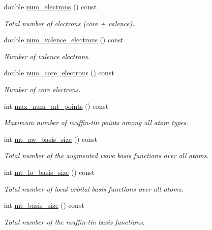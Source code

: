 \begin{DoxyCompactItemize}
\item 
double \hyperlink{classsirius_1_1_unit__cell_af773aee1295a5be6c706b29959ff4592}{num\+\_\+electrons} () const 
\begin{DoxyCompactList}\small\item\em Total number of electrons (core + valence). \end{DoxyCompactList}\item 
double \hyperlink{classsirius_1_1_unit__cell_a3d0dc243ec23f8fed279c78f67da015a}{num\+\_\+valence\+\_\+electrons} () const 
\begin{DoxyCompactList}\small\item\em Number of valence electrons. \end{DoxyCompactList}\item 
double \hyperlink{classsirius_1_1_unit__cell_ae418b2e1ec7145fecc823dea73589b1a}{num\+\_\+core\+\_\+electrons} () const 
\begin{DoxyCompactList}\small\item\em Number of core electrons. \end{DoxyCompactList}\item 
int \hyperlink{classsirius_1_1_unit__cell_a6a1a396053eb4992139576d887c66662}{max\+\_\+num\+\_\+mt\+\_\+points} () const 
\begin{DoxyCompactList}\small\item\em Maximum number of muffin-\/tin points among all atom types. \end{DoxyCompactList}\item 
int \hyperlink{classsirius_1_1_unit__cell_a163d3e6e7306ffaf6f51eb20e8d8228d}{mt\+\_\+aw\+\_\+basis\+\_\+size} () const 
\begin{DoxyCompactList}\small\item\em Total number of the augmented wave basis functions over all atoms. \end{DoxyCompactList}\item 
int \hyperlink{classsirius_1_1_unit__cell_a5ebddaa856d8f93893d7c041251afb35}{mt\+\_\+lo\+\_\+basis\+\_\+size} () const 
\begin{DoxyCompactList}\small\item\em Total number of local orbital basis functions over all atoms. \end{DoxyCompactList}\item 
int \hyperlink{classsirius_1_1_unit__cell_a5ed10c6520923550e73175c91f08d1e4}{mt\+\_\+basis\+\_\+size} () const 
\begin{DoxyCompactList}\small\item\em Total number of the muffin-\/tin basis functions. \end{DoxyCompactList}\item 

\end{DoxyCompactItemize}
